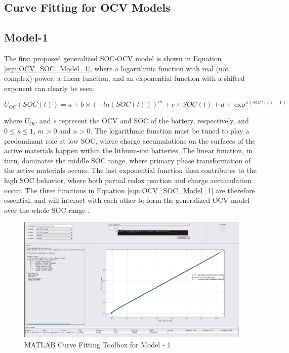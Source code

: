 \documentclass[12pt]{article}
\begin{document}
\begin{appendices}
\section{Curve Fitting for OCV Models} \label{Curve_Fitting_Appendeix}

\subsection{Model-1} \label{Model-1}
The first proposed generalized SOC-OCV model is shown in Equation \ref{eqn:OCV_SOC_Model_1}, where a logarithmic function with real (not complex) power, a linear function, and an exponential function with a shifted exponent can clearly be seen:

\begin{equation}
	\label{eqn:OCV_SOC_Model_1}
	U_{OC}(SOC(t)) = a  + b \times (-ln(SOC(t)))^m + c \times SOC(t) + d \times \exp^{n(SOC(t)-1)}
\end{equation}

\noindent where $U_{OC}$ and $s$ represent the OCV and SOC of the battery, respectively, and $0 \leq s \leq 1$, $m > 0$ and $n > 0$. The logarithmic function must be tuned to play a predominant role at low SOC, where charge accumulations on the surfaces of the active materials happen within the lithium-ion batteries. The linear function, in turn, dominates the middle SOC range, where primary phase transformation of the active materials occurs. The last exponential function then contributes to the high SOC behavior, where both partial redox reaction and charge accumulation occur. The three functions in Equation \ref{eqn:OCV_SOC_Model_1} are therefore essential, and will interact with each other to form the generalized OCV model over the whole SOC range \cite{Zhang2016}.  \newline 

\begin{figure}[b!]
	\centering
	\includegraphics[width=1.0\textwidth, keepaspectratio]{images/Curve_Fitting_1.pdf}
	\caption{MATLAB Curve Fitting Toolbox for Model - 1}
	\label{fig:OCV_SOC_Model_1}
\end{figure}


\end{appendices}
\end{document}
